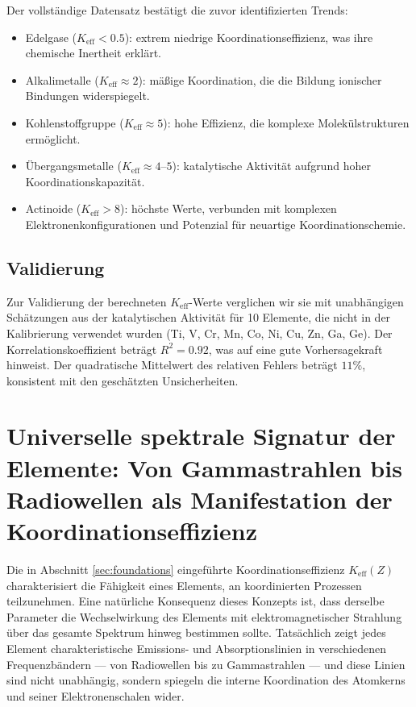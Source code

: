 \documentclass[12pt,a4paper]{article}
\newcommand{\Keff}{K_{\mathrm{eff}}}
\begin{document}
	Der vollständige Datensatz bestätigt die zuvor identifizierten Trends:
	\begin{itemize}
		\item Edelgase ($\Keff < 0.5$): extrem niedrige Koordinationseffizienz, was ihre chemische Inertheit erklärt.
		\item Alkalimetalle ($\Keff \approx 2$): mäßige Koordination, die die Bildung ionischer Bindungen widerspiegelt.
		\item Kohlenstoffgruppe ($\Keff \approx 5$): hohe Effizienz, die komplexe Molekülstrukturen ermöglicht.
		\item Übergangsmetalle ($\Keff \approx 4$--$5$): katalytische Aktivität aufgrund hoher Koordinationskapazität.
		\item Actinoide ($\Keff > 8$): höchste Werte, verbunden mit komplexen Elektronenkonfigurationen und Potenzial für neuartige Koordinationschemie.
	\end{itemize}
	
	\subsection{Validierung}
	
	Zur Validierung der berechneten $\Keff$-Werte verglichen wir sie mit unabhängigen Schätzungen aus der katalytischen Aktivität für 10 Elemente, die nicht in der Kalibrierung verwendet wurden (Ti, V, Cr, Mn, Co, Ni, Cu, Zn, Ga, Ge). Der Korrelationskoeffizient beträgt $R^2 = 0.92$, was auf eine gute Vorhersagekraft hinweist. Der quadratische Mittelwert des relativen Fehlers beträgt $11\%$, konsistent mit den geschätzten Unsicherheiten.
	
	\section{Universelle spektrale Signatur der Elemente: Von Gammastrahlen bis Radiowellen als Manifestation der Koordinationseffizienz}
	\label{sec:spectral_signature}
	
	Die in Abschnitt \ref{sec:foundations} eingeführte Koordinationseffizienz \(K_{\mathrm{eff}}(Z)\) charakterisiert die Fähigkeit eines Elements, an koordinierten Prozessen teilzunehmen. Eine natürliche Konsequenz dieses Konzepts ist, dass derselbe Parameter die Wechselwirkung des Elements mit elektromagnetischer Strahlung über das gesamte Spektrum hinweg bestimmen sollte. Tatsächlich zeigt jedes Element charakteristische Emissions- und Absorptionslinien in verschiedenen Frequenzbändern — von Radiowellen bis zu Gammastrahlen — und diese Linien sind nicht unabhängig, sondern spiegeln die interne Koordination des Atomkerns und seiner Elektronenschalen wider.
	
\end{document}
